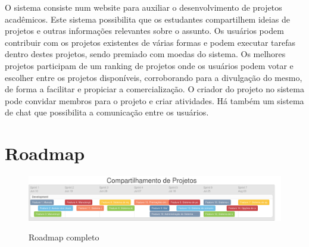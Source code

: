 \begin{apendicesenv}
O sistema consiste num website para auxiliar o desenvolvimento de projetos acadêmicos. Este sistema possibilita que os estudantes compartilhem ideias de projetos e outras informações relevantes sobre o assunto. Os usuários podem contribuir com os projetos existentes de várias formas e podem executar tarefas dentro destes projetos, sendo premiado com moedas do sistema. Os melhores projetos participam de um ranking de projetos onde os usuários podem votar e escolher entre os projetos disponíveis, corroborando para a divulgação do mesmo, de forma a facilitar e propiciar a comercialização. O criador do projeto no sistema pode convidar membros para o projeto e criar atividades. Há também um sistema de chat que possibilita a comunicação entre os usuários.

\chapter{Roadmap}
\label{sec:roadmap}
\FloatBarrier
\begin{figure}[!htpd]
		\centering
		\includegraphics[scale=0.3]{figuras/roadmap}
		\label{img:cronograma}
		\caption{Roadmap completo}
\end{figure}

\end{apendicesenv}
